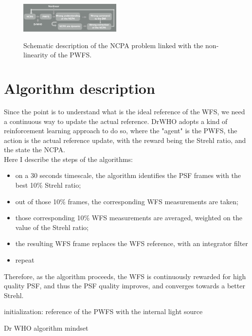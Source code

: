 \documentclass[twocolumn]{aastex62}
\begin{document}
\begin{figure}[h!]
  \centering
    \includegraphics[width=0.45\textwidth]{fig/pyr_ncpa_pb.png}\
      \caption{Schematic description of the NCPA problem linked with the non-linearity of the PWFS.}
    \label{fig:pyr_ncpa_pb}
\end{figure}


\section{Algorithm description}


Since the point is to understand what is the ideal reference of the WFS, we need a continuous way to update the actual reference. DrWHO adopts a kind of reinforcement learning approach to do so, where the "agent" is the PWFS, the action is the actual reference update, with the reward being the Strehl ratio, and the state the NCPA. \\
Here I describe the steps of the algorithms: 
\begin{itemize}
    \item on a 30 seconds timescale, the algorithm identifies the PSF frames with the best 10\% Strehl ratio;
    \item out of those 10\% frames, the corresponding WFS measurements are taken;
    \item those corresponding 10\% WFS measurements are averaged, weighted on the value of the Strehl ratio; 
    \item the resulting WFS frame replaces the WFS reference, with an integrator filter
    \item repeat 
\end{itemize}

Therefore, as the algorithm proceeds, the WFS is continuously rewarded for high quality PSF, and thus the PSF quality improves, and converges towards a better Strehl. \\


\begin{algorithm}[H]
 initialization: reference of the PWFS with the internal light source\;
 \caption{Dr WHO algorithm mindset}
\end{algorithm}
\end{document}
